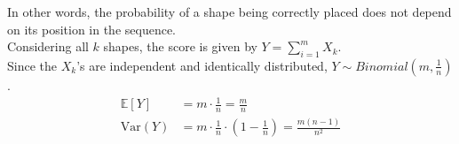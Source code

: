 \documentclass[a4paper,12pt]{article}
\begin{document}
\noindent In other words, the probability of a shape being correctly placed does not depend on its position in the sequence.\\

\noindent Considering all $k$ shapes, the score is given by $Y = \sum_{i=1}^{m}{X_k}$.\\
Since the $X_k$'s are independent and identically distributed, $Y \sim Binomial(m, \frac{1}{n})$.
\begin{align}
	\mathbb{E}[Y] &= m \cdot \frac{1}{n} = \frac{m}{n}\\
	\textrm{Var}(Y) &= m \cdot \frac{1}{n} \cdot (1 - \frac{1}{n}) = \frac{m(n-1)}{n^2}
\end{align}
\end{document}
